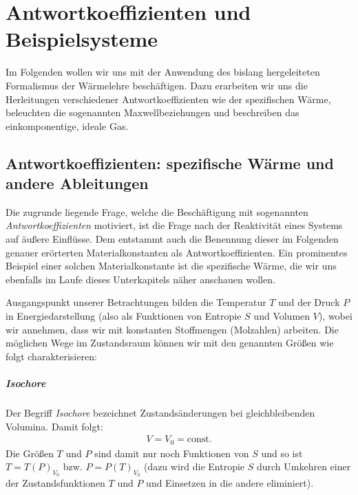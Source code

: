 \chapter{Antwortkoeffizienten und Beispielsysteme}\label{sec:Antwortkoeffizienten und Beispielsysteme}
Im Folgenden wollen wir uns mit der Anwendung des bislang hergeleiteten Formalismus der Wärmelehre beschäftigen. Dazu erarbeiten wir uns die Herleitungen verschiedener Antwortkoeffizienten wie der spezifischen Wärme, beleuchten die sogenannten Maxwellbeziehungen und beschreiben das einkomponentige, ideale Gas.
\section{Antwortkoeffizienten: spezifische Wärme und andere Ableitungen}
Die zugrunde liegende Frage, welche die Beschäftigung mit sogenannten \emph{Antwortkoeffizienten} motiviert, ist die Frage nach der Reaktivität eines Systems auf äußere Einflüsse. Dem entstammt auch die Benennung dieser \textendash{} im Folgenden genauer erörterten \textendash{} Materialkonstanten als Antwortkoeffizienten.
Ein prominentes Beispiel einer solchen Materialkonstante ist die spezifische Wärme, die wir uns ebenfalls im Laufe dieses Unterkapitels näher anschauen wollen.


Ausgangspunkt unserer Betrachtungen bilden die Temperatur $T$ und der Druck $P$ in Energiedarstellung (also als Funktionen von Entropie $S$ und Volumen $V$), wobei wir annehmen, dass wir mit konstanten Stoffmengen (Molzahlen) arbeiten.  Die möglichen Wege im Zustandsraum können wir mit den genannten Größen wie folgt charakterisieren:


\paragraph*{Isochore}
Der Begriff \emph{Isochore} bezeichnet Zustandsänderungen bei gleichbleibenden Volumina. Damit folgt:
\begin{align*}
    V=V_0=\mathrm{const}.
\end{align*}
Die Größen $T$ und $P$ sind damit nur noch Funktionen von $S$ und so ist $T=T(P)_{V_0}$ bzw. $P=P(T)_{V_0}$ (dazu wird die Entropie $S$ durch Umkehren einer der Zustandsfunktionen $T$ und $P$ und Einsetzen in die andere eliminiert).



